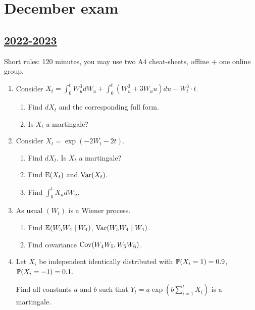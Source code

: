 
\newpage
\thispagestyle{empty}
\section{December exam}
 
\subsection[2022-2023]{\hyperref[sec:sol_kr_02_2022_2023]{2022-2023}}
\label{sec:kr_02_2022_2023} %



Short rules: 120 minutes, you may use two A4 cheat-sheets, offline + one online group.

\begin{enumerate}

\item Consider $X_t = \int_0^t W_u^3 dW_u + \int_0^t (W_u^3 + 3W_u u ) du - W_t^3 \cdot t$.

\begin{enumerate}
    \item Find $dX_t$ and the corresponding full form. 
    \item Is $X_t$ a martingale?
\end{enumerate}

\item Consider $X_t = \exp(-2W_t - 2t)$.
\begin{enumerate}
    \item Find $dX_t$. Is $X_t$ a martingale?
    \item Find $\E(X_t)$ and $\Var(X_t)$.
    \item Find $\int_0^t X_u dW_u$.
\end{enumerate}

\item As usual $(W_t)$ is a Wiener process.
\begin{enumerate}
    \item Find $\E(W_5 W_4 \mid W_4)$, $\Var(W_5 W_4 \mid W_4)$.
    \item Find covariance $\Cov(W_4 W_5, W_5 W_6)$.
\end{enumerate}

\item Let $X_i$ be independent identically distributed with $\P(X_i = 1) = 0.9$, $\P(X_i = -1 ) = 0.1$. 

Find all constants $a$ and $b$ such that $Y_t = a \exp\left(b\sum_{i=1}^t X_i\right)$ is a martingale. 


\end{enumerate}
